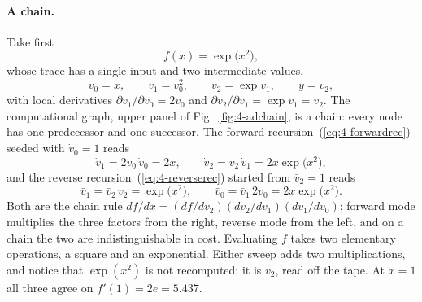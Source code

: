 \paragraph{A chain.}
Take first
\begin{equation}
  f(x)=\exp\bigl(x^{2}\bigr),
  \label{eq:4-adchainfun}
\end{equation}
whose trace has a single input and two intermediate values,
\begin{equation}
  v_0 = x,\qquad v_1 = v_0^{2},\qquad v_2 = \exp v_1,\qquad y = v_2 ,
  \label{eq:4-adchaintrace}
\end{equation}
with local derivatives $\partial v_1/\partial v_0=2v_0$ and
$\partial v_2/\partial v_1=\exp v_1=v_2$.  The computational graph, upper
panel of Fig.~\ref{fig:4-adchain}, is a chain: every node has one
predecessor and one successor.  The forward recursion~(\ref{eq:4-forwardrec})
seeded with $\dot v_0=1$ reads
\begin{equation}
  \dot v_1 = 2v_0\,\dot v_0 = 2x,\qquad
  \dot v_2 = v_2\,\dot v_1 = 2x\exp\bigl(x^{2}\bigr),
  \label{eq:4-adchainforward}
\end{equation}
and the reverse recursion~(\ref{eq:4-reverserec}) started from $\bar v_2=1$
reads
\begin{equation}
  \bar v_1 = \bar v_2\,v_2 = \exp\bigl(x^{2}\bigr),\qquad
  \bar v_0 = \bar v_1\,2v_0 = 2x\exp\bigl(x^{2}\bigr).
  \label{eq:4-adchainreverse}
\end{equation}
Both are the chain rule $df/dx=(df/dv_2)(dv_2/dv_1)(dv_1/dv_0)$; forward
mode multiplies the three factors from the right, reverse mode from the
left, and on a chain the two are indistinguishable in cost.  Evaluating
$f$ takes two elementary operations, a square and an exponential.  Either
sweep adds two multiplications, and notice that $\exp(x^{2})$ is not
recomputed: it is $v_2$, read off the tape.  At $x=1$ all three agree on
$f'(1)=2e=5.437$.


